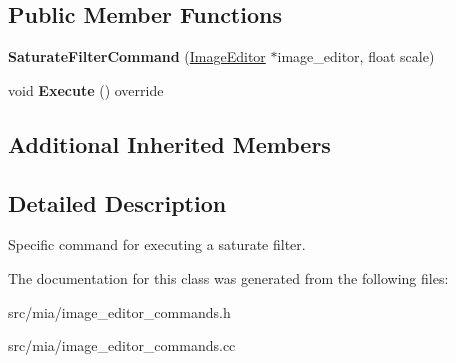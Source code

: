 \subsection*{Public Member Functions}
\begin{DoxyCompactItemize}
\item 
\mbox{\label{classimage__tools_1_1SaturateFilterCommand_ac0f09b6034b2925e35db829b42c9ee9e}} 
{\bfseries Saturate\+Filter\+Command} (\hyperlink{classimage__tools_1_1ImageEditor}{Image\+Editor} $\ast$image\+\_\+editor, float scale)
\item 
\mbox{\label{classimage__tools_1_1SaturateFilterCommand_a8677cb21e8e951040445713fba0eaa37}} 
void {\bfseries Execute} () override
\end{DoxyCompactItemize}
\subsection*{Additional Inherited Members}


\subsection{Detailed Description}
Specific command for executing a saturate filter. 

The documentation for this class was generated from the following files\+:\begin{DoxyCompactItemize}
\item 
src/mia/image\+\_\+editor\+\_\+commands.\+h\item 
src/mia/image\+\_\+editor\+\_\+commands.\+cc\end{DoxyCompactItemize}
